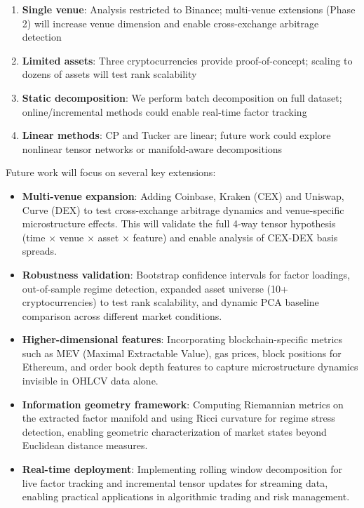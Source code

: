 \documentclass[11pt,twocolumn]{article}
\begin{document}
\begin{enumerate}[leftmargin=*]
    \item \textbf{Single venue}: Analysis restricted to Binance; multi-venue extensions (Phase 2) will increase venue dimension and enable cross-exchange arbitrage detection
    \item \textbf{Limited assets}: Three cryptocurrencies provide proof-of-concept; scaling to dozens of assets will test rank scalability
    \item \textbf{Static decomposition}: We perform batch decomposition on full dataset; online/incremental methods could enable real-time factor tracking
    \item \textbf{Linear methods}: CP and Tucker are linear; future work could explore nonlinear tensor networks or manifold-aware decompositions
\end{enumerate}

Future work will focus on several key extensions:

\begin{itemize}[leftmargin=*]
    \item \textbf{Multi-venue expansion}: Adding Coinbase, Kraken (CEX) and Uniswap, Curve (DEX) to test cross-exchange arbitrage dynamics and venue-specific microstructure effects. This will validate the full 4-way tensor hypothesis (time $\times$ venue $\times$ asset $\times$ feature) and enable analysis of CEX-DEX basis spreads.
    \item \textbf{Robustness validation}: Bootstrap confidence intervals for factor loadings, out-of-sample regime detection, expanded asset universe (10+ cryptocurrencies) to test rank scalability, and dynamic PCA baseline comparison across different market conditions.
    \item \textbf{Higher-dimensional features}: Incorporating blockchain-specific metrics such as MEV (Maximal Extractable Value), gas prices, block positions for Ethereum, and order book depth features to capture microstructure dynamics invisible in OHLCV data alone.
    \item \textbf{Information geometry framework}: Computing Riemannian metrics on the extracted factor manifold and using Ricci curvature for regime stress detection, enabling geometric characterization of market states beyond Euclidean distance measures.
    \item \textbf{Real-time deployment}: Implementing rolling window decomposition for live factor tracking and incremental tensor updates for streaming data, enabling practical applications in algorithmic trading and risk management.
\end{itemize}
\end{document}
